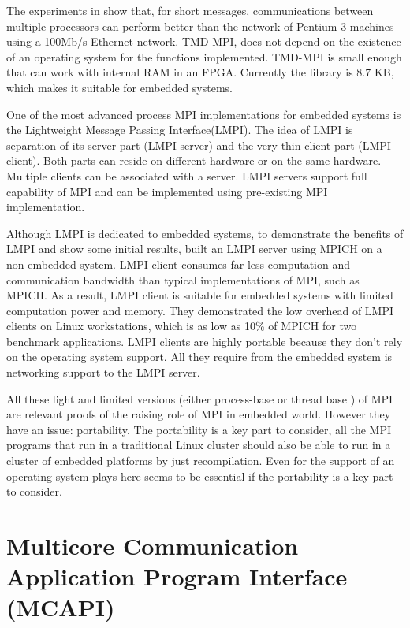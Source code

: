 The experiments in \cite{Saldana-Chow}  show that, for short messages,
communications between multiple processors can perform better than the network
of Pentium 3 machines using a 100Mb/s Ethernet network. TMD-MPI, does not
depend on the existence of an operating system for the functions implemented.
TMD-MPI is small enough that can work with internal RAM in an FPGA. Currently
the library is 8.7 KB, which makes it suitable for embedded systems.

One of the most advanced process MPI implementations for embedded
systems is the Lightweight Message Passing Interface(LMPI)\cite{Abgaria}. The
idea of LMPI is separation of its server part (LMPI server) and the very thin
client part (LMPI client). Both parts can reside on different hardware or on
the same hardware. Multiple clients can be associated with a server. LMPI
servers support full capability of MPI and can be implemented using
pre-existing MPI implementation. 

Although LMPI is dedicated to embedded systems, to demonstrate the benefits of
LMPI and show some initial results, \cite{Abgaria} built an LMPI server using
MPICH on a non-embedded system. LMPI client consumes far less computation and
communication bandwidth than typical implementations of MPI, such as MPICH.  As
a result, LMPI client is suitable for embedded systems with limited computation
power and memory. They demonstrated the low overhead of LMPI clients on Linux
workstations, which is as low as 10\% of MPICH for two benchmark applications.
LMPI clients are highly portable because they don't rely on the operating
system support. All they require from the embedded system is networking support
to the LMPI server.

All these light and limited versions (either process-base or thread base ) of
MPI are relevant proofs of the raising role of MPI in embedded world. However
they have an issue: portability. The portability is a key part to consider, all
the MPI programs that run in a traditional Linux cluster should also be able to
run in a cluster of embedded platforms  by just recompilation.  Even for
\cite{Gallego} the support of an operating system plays here seems to be
essential if the portability is a key part to consider.

\section{Multicore Communication Application Program Interface (MCAPI)}

